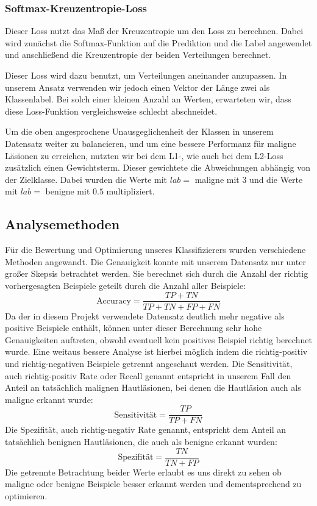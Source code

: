 \subsubsection{Softmax-Kreuzentropie-Loss}
	Dieser Loss nutzt das Maß der Kreuzentropie um den Loss zu berechnen. Dabei wird zunächst die Softmax-Funktion auf die Prediktion und die Label angewendet und anschließend die Kreuzentropie der beiden Verteilungen berechnet.
	
	Dieser Loss wird dazu benutzt, um Verteilungen aneinander anzupassen. In unserem Ansatz verwenden wir jedoch einen Vektor der Länge zwei als Klassenlabel. Bei solch einer kleinen Anzahl an Werten, erwarteten wir, dass diese Loss-Funktion vergleichsweise schlecht abschneidet.
		
Um die oben angesprochene Unausgeglichenheit der Klassen in unserem Datensatz weiter zu balancieren, und um eine bessere Performanz für maligne Läsionen zu erreichen, nutzten wir bei dem L1-, wie auch bei dem L2-Loss zusätzlich einen Gewichtsterm. Dieser gewichtete die Abweichungen abhängig von der Zielklasse. Dabei wurden die Werte mit $lab=$ maligne mit $3$ und die Werte mit $lab=$ benigne mit $0.5$ multipliziert. 
	  

\subsection{Analysemethoden}

Für die Bewertung und Optimierung unseres Klassifizierers wurden verschiedene Methoden angewandt. Die Genauigkeit konnte mit unserem Datensatz nur unter großer Skepsis betrachtet werden. Sie berechnet sich durch die Anzahl der richtig vorhergesagten Beispiele geteilt durch die Anzahl aller Beispiele:
	\[\text{Accuracy} = \frac{TP+TN}{TP+TN+FP+FN}\]
Da der in diesem Projekt verwendete Datensatz deutlich mehr negative als positive Beispiele enthält, können unter dieser Berechnung sehr hohe Genauigkeiten auftreten, obwohl eventuell kein positives Beispiel richtig berechnet wurde. Eine weitaus bessere Analyse ist hierbei möglich indem die richtig-positiv und richtig-negativen Beispiele getrennt angeschaut werden. Die Sensitivität, auch richtig-positiv Rate oder Recall genannt entspricht in unserem Fall den Anteil an tatsächlich malignen Hautläsionen, bei denen die Hautläsion auch als maligne erkannt wurde: 
\[\text{Sensitivität} = \frac{TP}{TP+FN}\]
Die Spezifität, auch richtig-negativ Rate genannt, entspricht dem Anteil an tatsächlich benignen Hautläsionen, die auch als benigne erkannt wurden:
\[\text{Spezifität} = \frac{TN}{TN+FP}\]
Die getrennte Betrachtung beider Werte erlaubt es uns direkt zu sehen ob maligne oder benigne Beispiele besser erkannt werden und dementsprechend zu optimieren.


